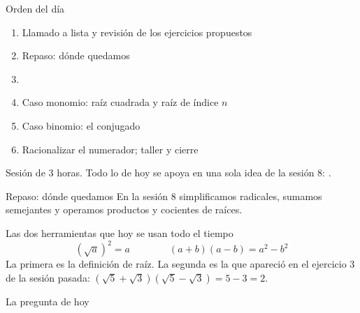 \documentclass[aspectratio=169,10pt]{beamer}
\begin{document}
\portada

\begin{frame}{Orden del día}
  \begin{enumerate}
    \item Llamado a lista y revisión de los ejercicios propuestos
    \item Repaso: dónde quedamos
    \item {}
    \item Caso monomio: raíz cuadrada y raíz de índice $n$
    \item Caso binomio: el conjugado
    \item Racionalizar el numerador; taller y cierre
  \end{enumerate}

  \vspace{0.25cm}
  {\footnotesize\color{uniGris} Sesión de 3 horas. Todo lo de hoy se apoya en
  una sola idea de la sesión 8: .}
\end{frame}

\begin{frame}{Repaso: dónde quedamos}
  \footnotesize
  En la sesión 8 simplificamos radicales, sumamos semejantes y operamos
  productos y cocientes de raíces.

  \vspace{0.15cm}
  \begin{alertblock}{Las dos herramientas que hoy se usan todo el tiempo}
    \scriptsize
    \[ \left(\sqrt{a}\right)^{2} = a \qquad\qquad
       (a+b)(a-b) = a^{2}-b^{2} \]
    La primera es la definición de raíz. La segunda es la
     que apareció en el ejercicio 3 de la sesión
    pasada: $(\sqrt5+\sqrt3)(\sqrt5-\sqrt3) = 5-3 = 2$.
  \end{alertblock}

  \vspace{0.15cm}
  \begin{block}{La pregunta de hoy}
    \footnotesize
  \end{block}
\end{frame}

\end{document}
